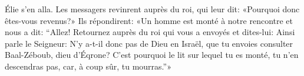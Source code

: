 Élie s’en alla.
Les messagers revinrent auprès du roi, qui leur dit:
	«Pourquoi donc êtes-vous revenus?»
Ils répondirent: «Un homme est monté à notre rencontre et nous a dit:
	“Allez! Retournez auprès du roi qui vous a envoyés et dites-lui:
	Ainsi parle le Seigneur: N’y a-t-il donc pas de Dieu en Israël,
	que tu envoies consulter Baal-Zéboub, dieu d’Éqrone?
	C’est pourquoi le lit sur lequel tu es monté, tu n’en descendras pas,
	car, à coup sûr, tu mourras.”»
